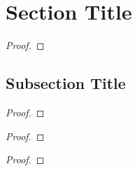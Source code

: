 \section{Section Title}

\begin{thrm}
    \lipsum[1]
\end{thrm}

\begin{proof}
    \lipsum[1]
\end{proof}

\lipsum[1]

\subsection{Subsection Title}

\begin{thrm}
    \lipsum[1]
\end{thrm}

\begin{proof}
    \lipsum[1]
\end{proof}

\begin{coro}
    \lipsum[1]
\end{coro}

\begin{proof}
    \lipsum[1]
\end{proof}

\begin{coro}
    \lipsum[1]
\end{coro}

\begin{proof}
    \lipsum[1]
\end{proof}

\begin{defn}
    \lipsum[1]
\end{defn}

\begin{rmrk}
    \lipsum[1]
\end{rmrk}

\begin{exmp}
    \lipsum[1]
\end{exmp}

\begin{defn}
    \lipsum[1]
\end{defn}

\begin{exmp}
    \lipsum[1]
\end{exmp}


